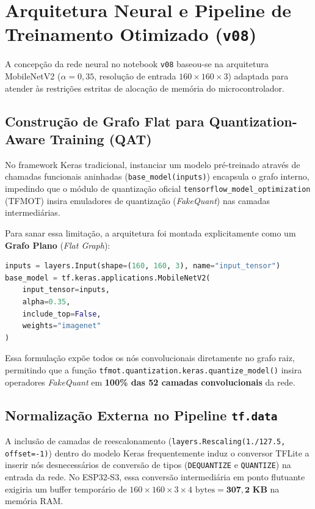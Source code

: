 \section{Arquitetura Neural e Pipeline de Treinamento Otimizado (\texttt{v08})}

A concepção da rede neural no notebook \texttt{v08} baseou-se na arquitetura MobileNetV2 ($\alpha = 0,35$, resolução de entrada $160 \times 160 \times 3$) adaptada para atender às restrições estritas de alocação de memória do microcontrolador.

\subsection{Construção de Grafo Flat para Quantization-Aware Training (QAT)}

No framework Keras tradicional, instanciar um modelo pré-treinado através de chamadas funcionais aninhadas (\texttt{base\_model(inputs)}) encapsula o grafo interno, impedindo que o módulo de quantização oficial \texttt{tensorflow\_model\_optimization} (TFMOT) insira emuladores de quantização (\textit{FakeQuant}) nas camadas intermediárias. 

Para sanar essa limitação, a arquitetura foi montada explicitamente como um \textbf{Grafo Plano} (\textit{Flat Graph}):
\begin{lstlisting}[language=Python]
inputs = layers.Input(shape=(160, 160, 3), name="input_tensor")
base_model = tf.keras.applications.MobileNetV2(
    input_tensor=inputs,
    alpha=0.35,
    include_top=False,
    weights="imagenet"
)
\end{lstlisting}
Essa formulação expõe todos os nós convolucionais diretamente no grafo raiz, permitindo que a função \texttt{tfmot.quantization.keras.quantize\_model()} insira operadores \textit{FakeQuant} em \textbf{100\% das 52 camadas convolucionais} da rede.

\subsection{Normalização Externa no Pipeline \texttt{tf.data}}

A inclusão de camadas de reescalonamento (\texttt{layers.Rescaling(1./127.5, offset=-1)}) dentro do modelo Keras frequentemente induz o conversor TFLite a inserir nós desnecessários de conversão de tipos (\texttt{DEQUANTIZE} e \texttt{QUANTIZE}) na entrada da rede. No ESP32-S3, essa conversão intermediária em ponto flutuante exigiria um buffer temporário de $160 \times 160 \times 3 \times 4\text{ bytes} = \mathbf{307,2\text{ KB}}$ na memória RAM.

